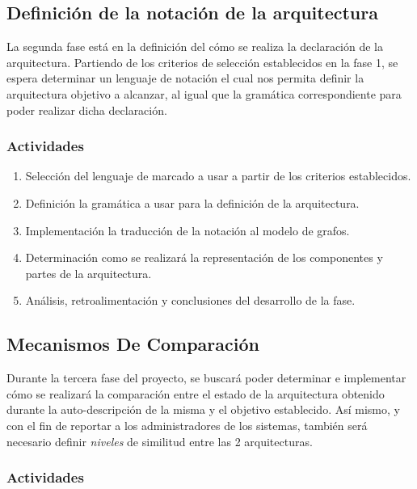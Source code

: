 \documentclass[12pt]{article}
\begin{document}
\subsection{Definición de la notación de la arquitectura}

La segunda fase está en la definición del cómo se realiza la declaración de la arquitectura. Partiendo de los criterios de selección establecidos en la fase 1, se espera determinar un lenguaje de notación el cual nos permita definir la arquitectura objetivo a alcanzar, al igual que la gramática correspondiente para poder realizar dicha declaración.

\subsubsection*{Actividades}

\begin{enumerate}[label=\thesubsection.\arabic*., wide, labelindent=2em, leftmargin=5em]
	\item Selección del lenguaje de marcado a usar a partir de los criterios establecidos.
	\item Definición la gramática a usar para la definición de la arquitectura.
	\item Implementación la traducción de la notación al modelo de grafos. %
	\item Determinación como se realizará la representación de los componentes y partes de la arquitectura.
	\item Análisis, retroalimentación y conclusiones del desarrollo de la fase.
\end{enumerate}

\subsection{Mecanismos De Comparación}

Durante la tercera fase del proyecto, se buscará poder determinar e implementar cómo se realizará la comparación entre el estado de la arquitectura obtenido durante la auto-descripción de la misma y el objetivo establecido. Así mismo, y con el fin de reportar a los administradores de los sistemas, también será necesario definir \textit{niveles} de similitud entre las 2 arquitecturas.

\subsubsection*{Actividades}
\end{document}
